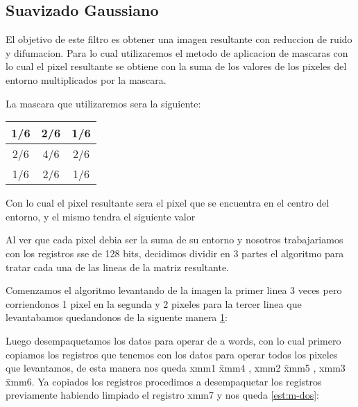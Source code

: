 \subsection{Suavizado Gaussiano}
El objetivo de este filtro es obtener una imagen resultante con reduccion de ruido y difumacion. Para lo cual utilizaremos el metodo de aplicacion de mascaras con lo cual el pixel resultante se obtiene con la suma de los valores de los pixeles del entorno multiplicados por la mascara.

La mascara que utilizaremos sera la siguiente:

\begin{tabular}{| c | c | c |}
1/6 & 2/6 & 1/6 \\
\hline
2/6 & 4/6 & 2/6 \\
\hline
1/6 & 2/6 & 1/6 \\
\hline
\end{tabular}

Con lo cual el pixel resultante sera el pixel que se encuentra en el centro del entorno, y el mismo tendra el siguiente valor



Al ver que cada pixel debia ser la suma de su entorno y nosotros trabajariamos con los registros sse de 128 bits, decidimos dividir en 3 partes el algoritmo para tratar cada una de las lineas de la matriz resultante.

Comenzamos el algoritmo levantando de la imagen la primer linea 3 veces pero corriendonos 1 pixel en la segunda y  2 pixeles para la tercer linea que levantabamos quedandonos de la siguente manera \ref{est:m-uno}:

\begin{figure}[ht]
\label{est:m-uno}
\end{figure}


Luego desempaquetamos los datos para operar de a words, con lo cual primero copiamos los registros que tenemos con los datos para operar todos los pixeles que levantamos, de esta manera nos queda xmm1 \= xmm4 , xmm2 \= xmm5 , xmm3 \= xmm6. Ya copiados los registros procedimos a desempaquetar los registros previamente habiendo limpiado el registro xmm7 y nos queda \ref{est:m-dos}:

